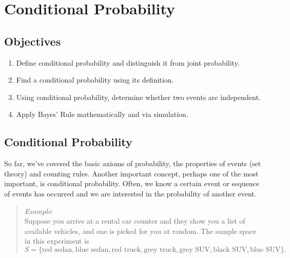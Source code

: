 \documentclass[
  letterpaper,
  DIV=11,
  numbers=noendperiod]{scrreprt}
\providecommand{\tightlist}{%
  \setlength{\itemsep}{0pt}\setlength{\parskip}{0pt}}\usepackage{longtable,booktabs,array}
\begin{document}

\chapter{Conditional Probability}\label{CONDPROB}

\section{Objectives}\label{objectives-9}

\begin{enumerate}
\def\labelenumi{\arabic{enumi})}
\tightlist
\item
  Define conditional probability and distinguish it from joint
  probability.\\
\item
  Find a conditional probability using its definition.\\
\item
  Using conditional probability, determine whether two events are
  independent.\\
\item
  Apply Bayes' Rule mathematically and via simulation.
\end{enumerate}

\newcommand{\E}{\mbox{E}}
\newcommand{\Var}{\mbox{Var}}
\newcommand{\Cov}{\mbox{Cov}}
\newcommand{\Prob}{\mbox{P}}
\newcommand*\diff{\mathop{}\!\mathrm{d}}

\section{Conditional Probability}\label{conditional-probability-1}

So far, we've covered the basic axioms of probability, the properties of
events (set theory) and counting rules. Another important concept,
perhaps one of the most important, is conditional probability. Often, we
know a certain event or sequence of events has occurred and we are
interested in the probability of another event.

\begin{quote}
\emph{Example}:\\
Suppose you arrive at a rental car counter and they show you a list of
available vehicles, and one is picked for you at random. The sample
space in this experiment is \[
S=\{\mbox{red sedan}, \mbox{blue sedan}, \mbox{red truck}, \mbox{grey truck}, \mbox{grey SUV}, \mbox{black SUV}, \mbox{blue SUV}\}.
\]
\end{quote}
\end{document}
